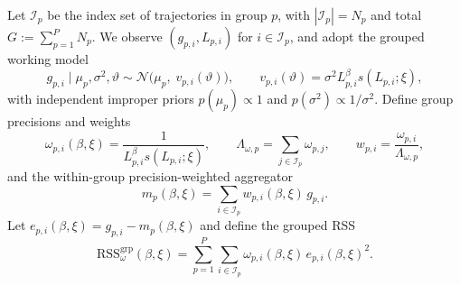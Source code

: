 Let $\mathcal I_p$ be the index set of trajectories in group $p$, with $|\mathcal I_p|=N_p$ and total $G:=\sum_{p=1}^P N_p$. We observe $(g_{p,i},L_{p,i})$ for $i\in\mathcal I_p$, and adopt the grouped working model
\begin{equation}
\label{eq:model-grouped}
g_{p,i}\mid \mu_p,\sigma^2,\vartheta \sim \mathcal N\!\Big(\mu_p,\; v_{p,i}(\vartheta)\Big),\qquad
v_{p,i}(\vartheta)=\sigma^2 L_{p,i}^{\beta}s(L_{p,i};\xi),
\end{equation}
with independent improper priors $p(\mu_p)\propto 1$ and $p(\sigma^2)\propto 1/\sigma^2$.
Define group precisions and weights
\begin{equation}
\label{eq:prec-weights-grouped}
\omega_{p,i}(\beta,\xi)=\frac{1}{L_{p,i}^{\beta}s(L_{p,i};\xi)},\qquad
\Lambda_{\omega,p}=\sum_{j\in\mathcal I_p}\omega_{p,j},\qquad
w_{p,i}=\frac{\omega_{p,i}}{\Lambda_{\omega,p}},
\end{equation}
and the within-group precision-weighted aggregator
\begin{equation}
\label{eq:mu-agg-grouped}
m_p(\beta,\xi)=\sum_{i\in\mathcal I_p} w_{p,i}(\beta,\xi)\,g_{p,i}.
\end{equation}
Let $e_{p,i}(\beta,\xi)=g_{p,i}-m_p(\beta,\xi)$ and define the grouped RSS
\begin{equation}
\label{eq:RSS-grouped}
\mathrm{RSS}_{\omega}^{\mathrm{grp}}(\beta,\xi)=\sum_{p=1}^P\sum_{i\in\mathcal I_p}\omega_{p,i}(\beta,\xi)\,e_{p,i}(\beta,\xi)^2.
\end{equation}

